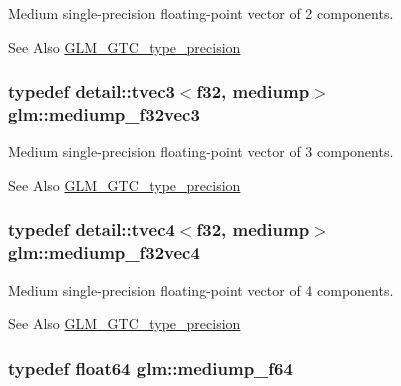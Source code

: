 Medium single-\/precision floating-\/point vector of 2 components. \begin{DoxySeeAlso}{See Also}
\hyperlink{group__gtc__type__precision}{G\-L\-M\-\_\-\-G\-T\-C\-\_\-type\-\_\-precision} 
\end{DoxySeeAlso}
\hypertarget{group__gtc__type__precision_gada8879dd10f28428e2eb1ae62f643f65}{
\subsubsection[{mediump\-\_\-f32vec3}]{\setlength{\rightskip}{0pt plus 5cm}typedef detail\-::tvec3$<$f32, mediump$>$ {\bf glm\-::mediump\-\_\-f32vec3}}}\label{group__gtc__type__precision_gada8879dd10f28428e2eb1ae62f643f65}
Medium single-\/precision floating-\/point vector of 3 components. \begin{DoxySeeAlso}{See Also}
\hyperlink{group__gtc__type__precision}{G\-L\-M\-\_\-\-G\-T\-C\-\_\-type\-\_\-precision} 
\end{DoxySeeAlso}
\hypertarget{group__gtc__type__precision_gaa5a1b058d185d87504591a11c6247518}{
\subsubsection[{mediump\-\_\-f32vec4}]{\setlength{\rightskip}{0pt plus 5cm}typedef detail\-::tvec4$<$f32, mediump$>$ {\bf glm\-::mediump\-\_\-f32vec4}}}\label{group__gtc__type__precision_gaa5a1b058d185d87504591a11c6247518}
Medium single-\/precision floating-\/point vector of 4 components. \begin{DoxySeeAlso}{See Also}
\hyperlink{group__gtc__type__precision}{G\-L\-M\-\_\-\-G\-T\-C\-\_\-type\-\_\-precision} 
\end{DoxySeeAlso}
\hypertarget{group__gtc__type__precision_gabd273bd38ea5e013aeec9ffd2b2591fb}{
\subsubsection[{mediump\-\_\-f64}]{\setlength{\rightskip}{0pt plus 5cm}typedef float64 {\bf glm\-::mediump\-\_\-f64}}}\label{group__gtc__type__precision_gabd273bd38ea5e013aeec9ffd2b2591fb}
